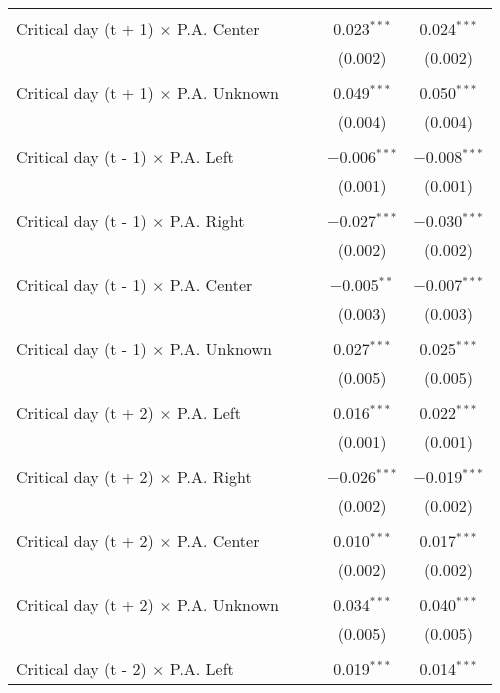 \documentclass[
]{article}
\begin{document}
\begin{table}[!htbp]
{\begin{tabular}{@{\extracolsep{5pt}}lcccc}
  & & & & \\ 
 Critical day (t + 1) $\times$ P.A. Center &  &  & 0.023$^{***}$ & 0.024$^{***}$ \\ 
  &  &  & (0.002) & (0.002) \\ 
  & & & & \\ 
 Critical day (t + 1) $\times$ P.A. Unknown &  &  & 0.049$^{***}$ & 0.050$^{***}$ \\ 
  &  &  & (0.004) & (0.004) \\ 
  & & & & \\ 
 Critical day (t - 1) $\times$ P.A. Left &  &  & $-$0.006$^{***}$ & $-$0.008$^{***}$ \\ 
  &  &  & (0.001) & (0.001) \\ 
  & & & & \\ 
 Critical day (t - 1) $\times$ P.A. Right &  &  & $-$0.027$^{***}$ & $-$0.030$^{***}$ \\ 
  &  &  & (0.002) & (0.002) \\ 
  & & & & \\ 
 Critical day (t - 1) $\times$ P.A. Center &  &  & $-$0.005$^{**}$ & $-$0.007$^{***}$ \\ 
  &  &  & (0.003) & (0.003) \\ 
  & & & & \\ 
 Critical day (t - 1) $\times$ P.A. Unknown &  &  & 0.027$^{***}$ & 0.025$^{***}$ \\ 
  &  &  & (0.005) & (0.005) \\ 
  & & & & \\ 
 Critical day (t + 2) $\times$ P.A. Left &  &  & 0.016$^{***}$ & 0.022$^{***}$ \\ 
  &  &  & (0.001) & (0.001) \\ 
  & & & & \\ 
 Critical day (t + 2) $\times$ P.A. Right &  &  & $-$0.026$^{***}$ & $-$0.019$^{***}$ \\ 
  &  &  & (0.002) & (0.002) \\ 
  & & & & \\ 
 Critical day (t + 2) $\times$ P.A. Center &  &  & 0.010$^{***}$ & 0.017$^{***}$ \\ 
  &  &  & (0.002) & (0.002) \\ 
  & & & & \\ 
 Critical day (t + 2) $\times$ P.A. Unknown &  &  & 0.034$^{***}$ & 0.040$^{***}$ \\ 
  &  &  & (0.005) & (0.005) \\ 
  & & & & \\ 
 Critical day (t - 2) $\times$ P.A. Left &  &  & 0.019$^{***}$ & 0.014$^{***}$ \\ 

\end{tabular}}
\end{table}
\end{document}
